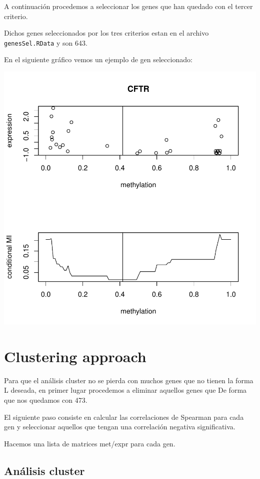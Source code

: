 \documentclass[a4paper,10pt]{article}
\begin{document}
\medskip
A continuación procedemos a seleccionar los genes que han quedado con el tercer criterio.


Dichos genes seleccionados por los tres criterios estan en el archivo \verb|genesSel.RData| y son 643.

\medskip
En el siguiente gráfico vemos un ejemplo de gen seleccionado:
\begin{center}
\includegraphics{figuras/-grafic1}
\end{center}

\section{Clustering approach}

Para que el análisis cluster no se pierda con muchos genes que no tienen la forma L deseada, en primer lugar procedemos a eliminar aquellos genes que 
De forma que nos quedamos con 473.

El siguiente paso consiste en calcular las correlaciones de Spearman para cada gen y seleccionar aquellos que tengan una correlación negativa significativa.


Hacemos una lista de matrices met/expr para cada gen. 

\subsection{Análisis cluster}
\end{document}
